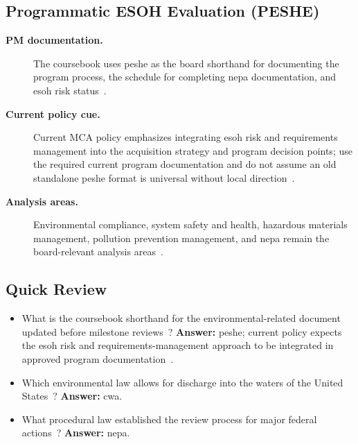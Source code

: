 \documentclass[../main.tex]{subfiles}
\begin{document}
\subsection{Programmatic ESOH Evaluation (PESHE)}
\begin{description}
  \item[\textbf{PM documentation.}] The coursebook uses \ac{peshe} as the board shorthand for documenting the program process, the schedule for completing \ac{nepa} documentation, and \ac{esoh} risk status~\autocite{edo-3-3-7-environmental-requirements-2025}.
  \item[\textbf{Current policy cue.}] Current MCA policy emphasizes integrating \ac{esoh} risk and requirements management into the acquisition strategy and program decision points; use the required current program documentation and do not assume an old standalone \ac{peshe} format is universal without local direction~\autocite{DoDI5000-85,DoDI5000-88}.
  \item[\textbf{Analysis areas.}] Environmental compliance, system safety and health, hazardous materials management, pollution prevention management, and \ac{nepa} remain the board-relevant analysis areas~\autocite{DoDI5000-85,edo-3-3-7-environmental-requirements-2025}.
\end{description}

\subsection{Quick Review}
\begin{itemize}
  \item What is the coursebook shorthand for the environmental-related document updated before milestone reviews~\autocite{edo-3-3-7-environmental-requirements-2025}? \textbf{Answer:} \ac{peshe}; current policy expects the \ac{esoh} risk and requirements-management approach to be integrated in approved program documentation~\autocite{DoDI5000-85}.
  \item Which environmental law allows for discharge into the waters of the United States~\autocite{edo-3-3-7-environmental-requirements-2025}? \textbf{Answer:} \ac{cwa}.
  \item What procedural law established the review process for major federal actions~\autocite{edo-3-3-7-environmental-requirements-2025}? \textbf{Answer:} \ac{nepa}.
\end{itemize}

\end{document}
